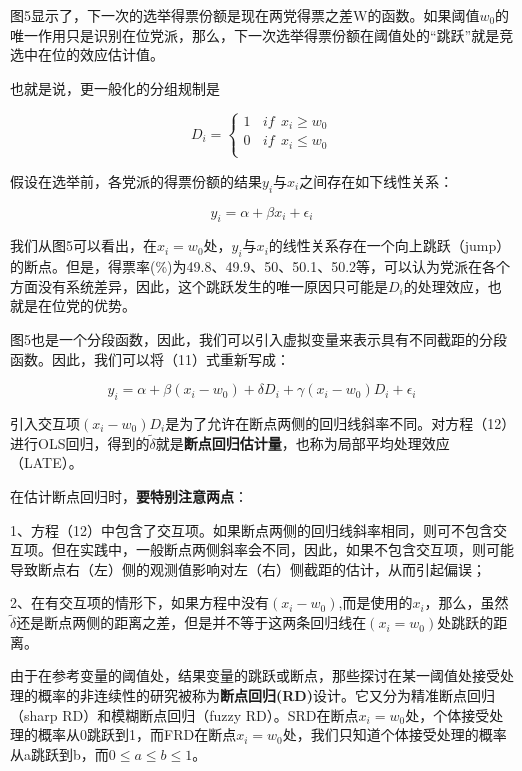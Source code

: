 \documentclass[cn,12pt,math=newtx,citestyle=gb7714-2015,bibstyle=gb7714-2015]{elegantbook}
\begin{document}
	图5显示了，下一次的选举得票份额是现在两党得票之差W的函数。如果阈值$w_0$的唯一作用只是识别在位党派，那么，下一次选举得票份额在阈值处的“跳跃”就是竞选中在位的效应估计值。
	
	也就是说，更一般化的分组规制是
	
	\begin{equation}
		D_i= \left\{
		\begin{aligned}
			1~~~~if ~~x_i\geq{w_0}  \\
			0~~~~if ~~x_i\le{w_0} \\
		\end{aligned}
		\right.
	\end{equation}
	
	假设在选举前，各党派的得票份额的结果$y_i$与$x_i$之间存在如下线性关系：
	
	\begin{equation}
		y_i=\alpha+\beta{x_i}+\epsilon_i
	\end{equation}
	
	我们从图5可以看出，在$x_i=w_0$处，$y_i$与$x_i$的线性关系存在一个向上跳跃（jump）的断点。但是，得票率(\%)为49.8、49.9、50、50.1、50.2等，可以认为党派在各个方面没有系统差异，因此，这个跳跃发生的唯一原因只可能是$D_i$的处理效应，也就是在位党的优势。
	
	图5也是一个分段函数，因此，我们可以引入虚拟变量来表示具有不同截距的分段函数。因此，我们可以将（11）式重新写成：
	
	\begin{equation}
		y_i=\alpha+\beta{(x_i-w_0)}+\delta{D_i}+\gamma{(x_i-w_0)D_i}+\epsilon_i
	\end{equation}
	
	引入交互项$(x_i-w_0)D_i$是为了允许在断点两侧的回归线斜率不同。对方程（12）进行OLS回归，得到的$\tilde{\delta}$就是\textbf{断点回归估计量}，也称为局部平均处理效应（LATE）。
	
	在估计断点回归时，\textbf{要特别注意两点}：
	
	1、方程（12）中包含了交互项。如果断点两侧的回归线斜率相同，则可不包含交互项。但在实践中，一般断点两侧斜率会不同，因此，如果不包含交互项，则可能导致断点右（左）侧的观测值影响对左（右）侧截距的估计，从而引起偏误；
	
	2、在有交互项的情形下，如果方程中没有$(x_i-w_0)$,而是使用的$x_i$，那么，虽然$\tilde{\delta}$还是断点两侧的距离之差，但是并不等于这两条回归线在$(x_i=w_0)$处跳跃的距离。
	
	由于在参考变量的阈值处，结果变量的跳跃或断点，那些探讨在某一阈值处接受处理的概率的非连续性的研究被称为\textbf{断点回归(RD)}设计。它又分为精准断点回归（sharp RD）和模糊断点回归（fuzzy RD）。SRD在断点$x_i=w_0$处，个体接受处理的概率从0跳跃到1，而FRD在断点$x_i=w_0$处，我们只知道个体接受处理的概率从a跳跃到b，而$0\le{a}\le{b}\le{1}$。
	
\end{document}
